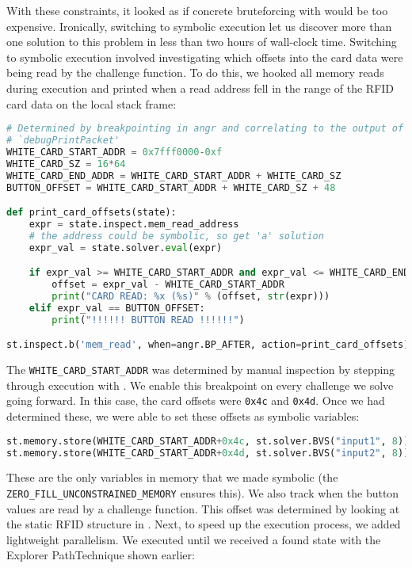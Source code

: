With these constraints, it looked as if concrete bruteforcing with \angr would be too expensive. Ironically, switching to symbolic execution let us discover more than one solution to this problem in less than two hours of wall-clock time. Switching to symbolic execution involved investigating which offsets into the card data were being read by the challenge function. To do this, we hooked all memory reads during execution and printed when a read address fell in the range of the RFID card data on the local stack frame:

\begin{lstlisting}[language=python]
# Determined by breakpointing in angr and correlating to the output of
# `debugPrintPacket'
WHITE_CARD_START_ADDR = 0x7fff0000-0xf
WHITE_CARD_SZ = 16*64
WHITE_CARD_END_ADDR = WHITE_CARD_START_ADDR + WHITE_CARD_SZ
BUTTON_OFFSET = WHITE_CARD_START_ADDR + WHITE_CARD_SZ + 48

def print_card_offsets(state):
    expr = state.inspect.mem_read_address
    # the address could be symbolic, so get 'a' solution
    expr_val = state.solver.eval(expr)

    if expr_val >= WHITE_CARD_START_ADDR and expr_val <= WHITE_CARD_END_ADDR:
        offset = expr_val - WHITE_CARD_START_ADDR
        print("CARD READ: %x (%s)" % (offset, str(expr)))
    elif expr_val == BUTTON_OFFSET:
        print("!!!!!! BUTTON READ !!!!!!")

st.inspect.b('mem_read', when=angr.BP_AFTER, action=print_card_offsets)
\end{lstlisting}

The \texttt{WHITE\_CARD\_START\_ADDR} was determined by manual inspection by stepping through execution with \angr. We enable this breakpoint on every challenge we solve going forward.
In this case, the card offsets were \texttt{0x4c} and \texttt{0x4d}. Once we had determined these, we were able to set these offsets as symbolic variables:

\begin{lstlisting}[language=python]
st.memory.store(WHITE_CARD_START_ADDR+0x4c, st.solver.BVS("input1", 8))
st.memory.store(WHITE_CARD_START_ADDR+0x4d, st.solver.BVS("input2", 8))
\end{lstlisting}

These are the only variables in memory that we made symbolic (the \texttt{ZERO\_FILL\_UNCONSTRAINED\_MEMORY} ensures this).
We also track when the button values are read by a challenge function. This offset was determined by looking at the static RFID structure in \ghidra.
Next, to speed up the execution process, we added lightweight parallelism. We executed until we received a found state with the Explorer PathTechnique shown earlier:

